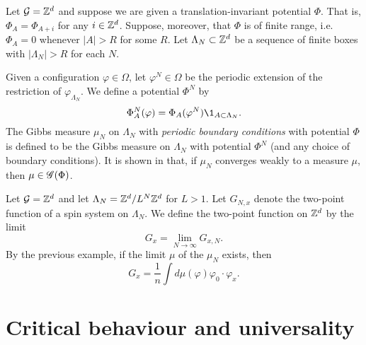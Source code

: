 \begin{example}
Let $\mathcal{G} = { {{\mathbb Z}}^d }$ and suppose we are given a translation-invariant potential $\Phi$.
That is, $\Phi_A = \Phi_{A + i}$ for any $i \in { {{\mathbb Z}}^d }$.
Suppose, moreover, that $\Phi$ is of finite range, i.e.\ $\Phi_A = 0$ whenever
$|A| > R$ for some $R$. Let $\Lambda_N \subset { {{\mathbb Z}}^d }$ be a sequence of finite boxes
with $|\Lambda_N| > R$ for each $N$.

Given a configuration $\varphi \in \Omega$, let $\varphi^N \in \Omega$
be the periodic extension of the restriction of $\varphi_{\Lambda_N}$.
We define a potential $\Phi^N$ by
\begin{equation}
\Phi^N_A(\varphi) = \Phi_A(\varphi^N) \1_{A \subset \Lambda_N}.
\end{equation}
The Gibbs measure $\mu_N$ on $\Lambda_N$ with \emph{periodic boundary conditions}
with potential $\Phi$ is defined to be the Gibbs measure on $\Lambda_N$ with
potential $\Phi^N$ (and any choice of boundary conditions).
It is shown in \cite[Example 4.20]{Georgii11} that, if $\mu_N$ converges weakly to a
measure $\mu$, then $\mu \in \mathscr{G}(\Phi)$.
\end{example}

\begin{example}
Let $\mathcal{G} = { {{\mathbb Z}}^d }$ and let $\Lambda_N = { {{\mathbb Z}}^d }/L^N{ {{\mathbb Z}}^d }$ for $L > 1$.
Let $G_{N,x}$ denote the two-point function of a spin system on $\Lambda_N$.
We define the two-point function on ${ {{\mathbb Z}}^d }$ by the limit
\begin{equation}
G_x = \lim_{N\to\infty} G_{x,N}.
\end{equation}
By the previous example, if the limit $\mu$ of the $\mu_N$ exists, then
\begin{equation}
G_x = \frac{1}{n} \int d\mu(\varphi) \varphi_0 \cdot \varphi_x.
\end{equation}
\end{example}


\section{Critical behaviour and universality}

